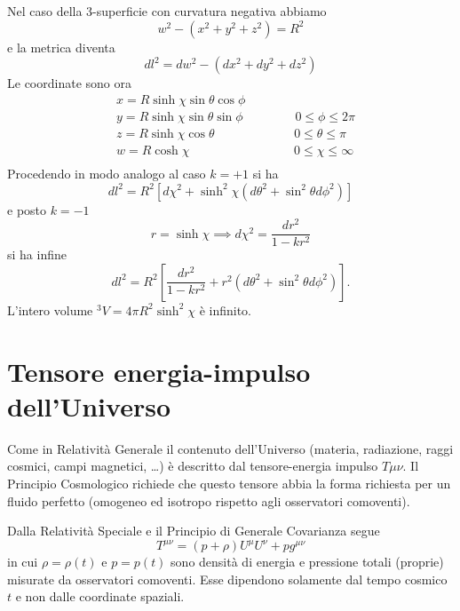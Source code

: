 Nel caso della 3-superficie con curvatura negativa abbiamo
\begin{equation}
  w^2 - (x^2+y^2+z^2) = R^2
\end{equation}
e la metrica diventa
\begin{equation}
  dl^2 = dw^2 - (dx^2+dy^2+dz^2)
\end{equation}
Le coordinate sono ora
\begin{equation}
  \begin{split}
    & x=R \sinh \chi \sin \theta \cos \phi~~~~~~~~~~~~~~~~  \\
    & y=R \sinh \chi \sin \theta \sin \phi~~~~~~~~~~~~~~~~~~~0\le \phi  \le 2 \pi \\
    & z=R \sinh \chi \cos \theta~~~~~~~~~~~~~~~~~~~~~~~~~~~~~0\le \theta \le \pi \\
    & w=R \cosh \chi ~~~~~~~~~~~~~~~~~~~~~~~~~~~~~~~~~~~~~  ~0\le \chi \le \infty    \\
  \end{split}
\end{equation}
Procedendo in modo analogo al caso $k=+1$ si ha
\begin{equation}
  dl^2 = R^2 \left[ d \chi^2 + \sinh^2 \chi \left( d \theta^2 + \sin^2 \theta d
      \phi^2 \right) \right]
\end{equation}
e posto $k=-1$
\begin{equation}
  r= \sinh \chi \implies d \chi^2 = \frac{dr^2}{1-kr^2}
\end{equation}
si ha infine
\begin{equation}
  dl^2 = R^2 \left[ \frac{dr^2} {1-kr^2} + r^2 (d \theta^2+\sin^2 \theta
    d\phi^2) \right].
\end{equation}
L'intero volume $^3V= 4 \pi R^2 \sinh^2 \chi$ è infinito.

\section{Tensore energia-impulso dell'Universo}

Come in Relatività Generale il contenuto dell'Universo (materia, radiazione,
raggi cosmici, campi magnetici, \dots) è descritto dal tensore-energia impulso
$T{\mu \nu}$.  Il Principio Cosmologico richiede che questo tensore abbia la
forma richiesta per un fluido perfetto (omogeneo ed isotropo rispetto agli
osservatori comoventi).

Dalla Relatività Speciale e il Principio di Generale Covarianza segue
\begin{equation}
  T^{\mu \nu} = ( p+ \rho) U^{\mu} U^{\nu} + p g^{\mu \nu}
\end{equation}
in cui $\rho= \rho(t)$ e $p= p(t)$ sono densità di energia e pressione totali
(proprie) misurate da osservatori comoventi.  Esse dipendono solamente dal tempo
cosmico $t$ e non dalle coordinate spaziali.

